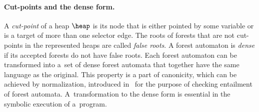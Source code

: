 {\paragraph{Cut-points and the dense form. }
A \emph{cut-point} of a heap $\heap$ is its node that is either pointed by some
variable or is a target of more than one selector edge.
The roots of forests that are not cut-points in the represented heaps are called \emph{false roots}.
%
A forest automaton is \emph{dense} if its accepted forests do not have false roots.
Each forest automaton can be transformed into a~set of dense forest automata that
together have the same language as the original.
%
This property is a part of canonicity, which can be achieved by normalization,
introduced in~\cite{forester12} for the purpose of checking entailment
of forest automata.
%
A~transformation to the dense form is essential in the symbolic execution of a~program.
%



}
